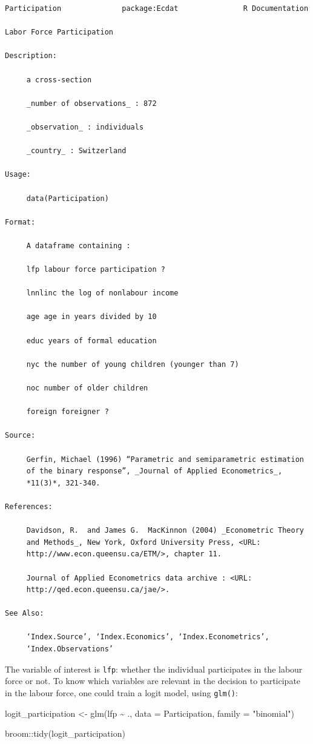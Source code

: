 \documentclass[
]{article}
\newenvironment{Shaded}{\begin{snugshade}}{\end{snugshade}}
\newcommand{\AttributeTok}[1]{\textcolor[rgb]{0.77,0.63,0.00}{#1}}
\newcommand{\FunctionTok}[1]{\textcolor[rgb]{0.00,0.00,0.00}{#1}}
\newcommand{\NormalTok}[1]{#1}
\newcommand{\OtherTok}[1]{\textcolor[rgb]{0.56,0.35,0.01}{#1}}
\newcommand{\SpecialCharTok}[1]{\textcolor[rgb]{0.00,0.00,0.00}{#1}}
\newcommand{\StringTok}[1]{\textcolor[rgb]{0.31,0.60,0.02}{#1}}
\begin{document}
\begin{verbatim}
Participation              package:Ecdat               R Documentation

Labor Force Participation

Description:

     a cross-section

     _number of observations_ : 872

     _observation_ : individuals

     _country_ : Switzerland

Usage:

     data(Participation)

Format:

     A dataframe containing :

     lfp labour force participation ?

     lnnlinc the log of nonlabour income

     age age in years divided by 10

     educ years of formal education

     nyc the number of young children (younger than 7)

     noc number of older children

     foreign foreigner ?

Source:

     Gerfin, Michael (1996) “Parametric and semiparametric estimation
     of the binary response”, _Journal of Applied Econometrics_,
     *11(3)*, 321-340.

References:

     Davidson, R.  and James G.  MacKinnon (2004) _Econometric Theory
     and Methods_, New York, Oxford University Press, <URL:
     http://www.econ.queensu.ca/ETM/>, chapter 11.

     Journal of Applied Econometrics data archive : <URL:
     http://qed.econ.queensu.ca/jae/>.

See Also:

     ‘Index.Source’, ‘Index.Economics’, ‘Index.Econometrics’,
     ‘Index.Observations’
\end{verbatim}

The variable of interest is \texttt{lfp}: whether the individual participates in the labour force or not.
To know which variables are relevant in the decision to participate in the labour force, one could
train a logit model, using \texttt{glm()}:

\begin{Shaded}
\begin{Highlighting}[]
\NormalTok{logit\_participation }\OtherTok{\textless{}{-}} \FunctionTok{glm}\NormalTok{(lfp }\SpecialCharTok{\textasciitilde{}}\NormalTok{ ., }\AttributeTok{data =}\NormalTok{ Participation, }\AttributeTok{family =} \StringTok{"binomial"}\NormalTok{)}

\NormalTok{broom}\SpecialCharTok{::}\FunctionTok{tidy}\NormalTok{(logit\_participation)}
\end{Highlighting}
\end{Shaded}
\end{document}
